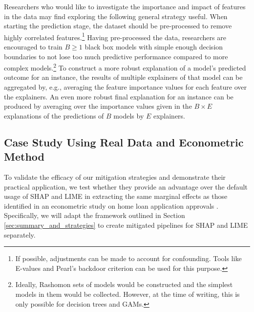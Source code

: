\documentclass[mnsc,blindrev]{informs3}
\begin{document}
            Researchers who would like to investigate the importance and impact of features in the data may find exploring the following general strategy useful.
            When starting the prediction stage, the dataset should be pre-processed to remove highly correlated features.\footnote{If possible, adjustments can be made to account for confounding. Tools like E-values\citep{gaster2023quantifying} and Pearl's backdoor criterion can be used for this purpose.} %
            Having pre-processed the data, researchers are encouraged to train $B\geq 1$ black box models with simple enough decision boundaries to not lose too much predictive performance compared to more complex models.\footnote{Ideally, Rashomon sets of models would be constructed and the simplest models in them would be collected. However, at the time of writing, this is only possible for decision trees and GAMs.} To construct a more robust explanation of a model's predicted outcome for an instance, the results of multiple explainers of that model can be aggregated by, e.g., averaging the feature importance values for each feature over the explainers. An even more robust final explanation for an instance can be produced by averaging over the importance values given in the $B\times E$ explanations of the predictions of $B$ models by $E$ explainers.
          


\subsection{Case Study Using Real Data and Econometric Method}
    \label{sec:case_study}
    To validate the efficacy of our mitigation strategies and demonstrate their practical application, we test whether they provide an advantage over the default usage of SHAP and LIME in extracting the same marginal effects as those identified in an econometric study on home loan application approvals \citep{bane2006econometric}. Specifically, we will adapt the framework outlined in Section \ref{sec:summary_and_strategies} to create mitigated pipelines for SHAP and LIME separately.
    
\end{document}
